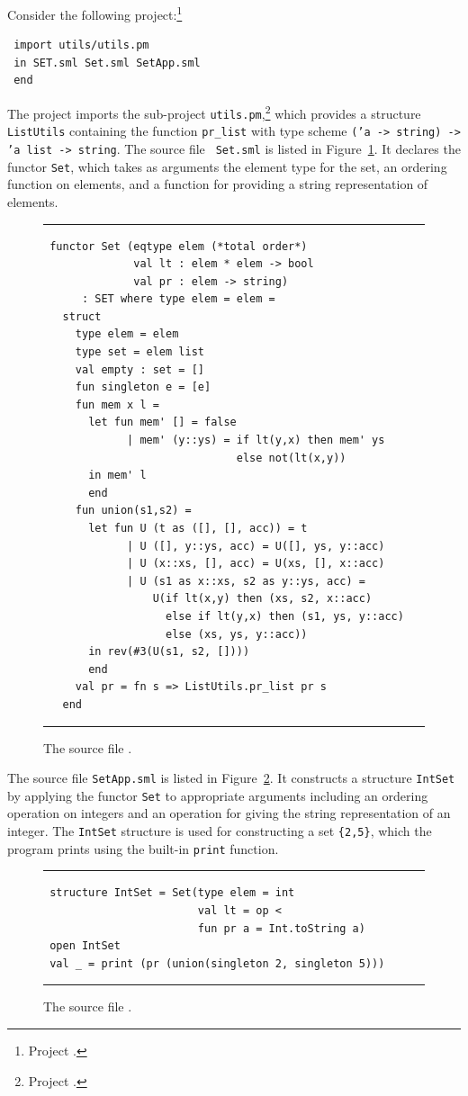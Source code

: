 \documentclass[12pt]{book}
\begin{document}
Consider the following project:\footnote{Project
  .}
\begin{verbatim}
 import utils/utils.pm
 in SET.sml Set.sml SetApp.sml
 end
\end{verbatim}
The project imports the sub-project {\tt utils.pm},\footnote{Project
.} which provides a structure {\tt
ListUtils} containing the function {\tt pr\_list} with type scheme
{\tt ('a -> string) -> 'a list -> string}. The source file {\tt
Set.sml} is listed in Figure~\ref{Set.fig}. It
declares the functor {\tt Set}, which takes as arguments the element
type for the set, an ordering function on elements, and a function for providing a string representation of elements.
\begin{figure}[ht]
\hrule \medskip
\begin{verbatim}
 functor Set (eqtype elem (*total order*)
              val lt : elem * elem -> bool
              val pr : elem -> string) 
      : SET where type elem = elem =
   struct
     type elem = elem
     type set = elem list
     val empty : set = []
     fun singleton e = [e]
     fun mem x l =
       let fun mem' [] = false
             | mem' (y::ys) = if lt(y,x) then mem' ys
                              else not(lt(x,y))
       in mem' l
       end
     fun union(s1,s2) =
       let fun U (t as ([], [], acc)) = t
             | U ([], y::ys, acc) = U([], ys, y::acc)
             | U (x::xs, [], acc) = U(xs, [], x::acc)
             | U (s1 as x::xs, s2 as y::ys, acc) =
                 U(if lt(x,y) then (xs, s2, x::acc)
                   else if lt(y,x) then (s1, ys, y::acc)
                   else (xs, ys, y::acc))
       in rev(#3(U(s1, s2, [])))
       end
     val pr = fn s => ListUtils.pr_list pr s
   end
\end{verbatim}
\caption{The source file .}
\medskip \hrule \label{Set.fig} 
\end{figure}

The source file {\tt SetApp.sml} is listed in
Figure~\ref{SetApp.fig}. It constructs a structure {\tt IntSet} by
applying the functor {\tt Set} to appropriate arguments including an
ordering operation on integers and an operation for giving the string
representation of an integer. The {\tt IntSet} structure is used for
constructing a set \verb+{2,5}+, which the program prints using the
built-in {\tt print} function.
\begin{figure}[ht]
\hrule \medskip
\begin{verbatim}
 structure IntSet = Set(type elem = int
                        val lt = op <
                        fun pr a = Int.toString a)
 open IntSet
 val _ = print (pr (union(singleton 2, singleton 5)))
\end{verbatim}
\caption{The source file .}
\medskip \hrule \label{SetApp.fig} 
\end{figure}
\end{document}
